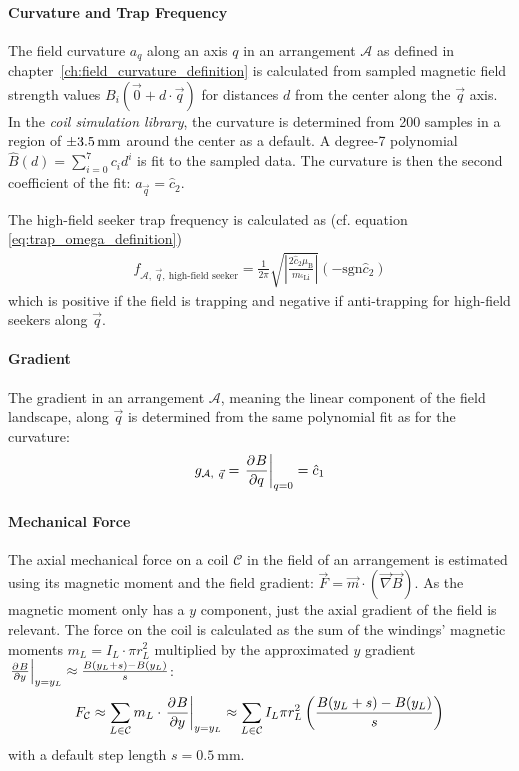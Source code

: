 \paragraph{Curvature and Trap Frequency}
The field curvature $a_q$ along an axis $q$ in an arrangement $\mathcal{A}$ as defined in chapter~\ref{ch:field_curvature_definition} is calculated from sampled magnetic field strength values $B_i(\vec 0 + d \cdot \vec q)$ for distances $d$ from the center along the $\vec q$ axis. In the \textit{coil simulation library}, the curvature is determined from \SI{200}{} samples in a region of $\SI{+-3.5}{\milli\meter}$ around the center as a default. A degree-7 polynomial ${\hat B(d) = \sum_{i=0}^7 c_i d^i}$ is fit to the sampled data. The curvature is then the second coefficient of the fit: $a_{\vec q} = \hat c_2$.

The high-field seeker trap frequency is calculated as (cf. equation \ref{eq:trap_omega_definition})
\begin{align}\label{eq:trap_frequency_simulation}
    f_{\mathcal{A},~\vec q,~\text{high-field seeker}} = \frac{1}{2\pi}  \sqrt{\left| \frac{2 \hat c_2 \mu_\text{B}}{m_{^6\text{Li}}} \right|} (-\mathrm{sgn} \hat c_2)
\end{align}
which is positive if the field is trapping and negative if anti-trapping for high-field seekers along $\vec q$.

\paragraph{Gradient}
The gradient in an arrangement $\mathcal{A}$, meaning the linear component of the field landscape, along $\vec q$ is determined from the same polynomial fit as for the curvature:
\begin{align}\label{eq:gradient_simulation}
    g_{\mathcal{A},~\vec q} = \eval{\pdv[]{B}{q}}_{q = 0} = \hat c_1
\end{align}

\paragraph{Mechanical Force}
The axial mechanical force on a coil $\mathcal{C}$ in the field of an arrangement is estimated using its magnetic moment and the field gradient: $\vec F = \vec m \cdot (\vec \nabla \vec B)$. As the magnetic moment only has a $y$ component, just the axial gradient of the field is relevant. The force on the coil is calculated as the sum of the windings' magnetic moments $m_L = I_L \cdot \pi r_L^2$ multiplied by the approximated $y$ gradient $\eval{\pdv[]{B}{y}}_{y = y_L} \approx \frac{B(y_L + s) - B(y_L)}{s}$:
\begin{align}\label{eq:mechanical_force_simulation}
    F_\mathcal{C} \approx \sum\limits_{L \in \mathcal{C}} m_L \cdot \eval{\pdv[]{B}{y}}_{y = y_L} \approx \sum\limits_{L \in \mathcal{C}} I_L \pi r_L^2 \left(\frac{B(y_L + s)-B(y_L)}{s}\right)
\end{align}
with a default step length $s = \SI{0.5}{\milli\meter}$.

